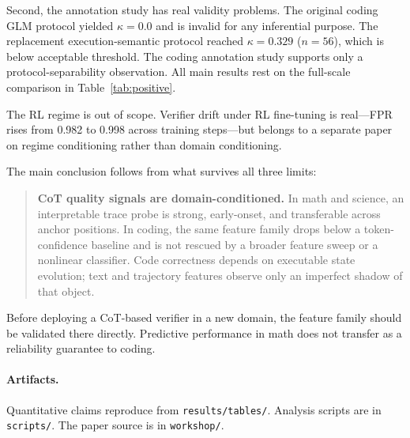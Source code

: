 \documentclass[10pt,twocolumn]{article}
\begin{document}
Second, the annotation study has real validity problems. The original coding GLM protocol yielded $\kappa = 0.0$ and is invalid for any inferential purpose. The replacement execution-semantic protocol reached $\kappa = 0.329$ ($n = 56$), which is below acceptable threshold. The coding annotation study supports only a protocol-separability observation. All main results rest on the full-scale comparison in Table~\ref{tab:positive}.

The RL regime is out of scope. Verifier drift under RL fine-tuning is real---FPR rises from 0.982 to 0.998 across training steps---but belongs to a separate paper on regime conditioning rather than domain conditioning.

The main conclusion follows from what survives all three limits:

\begin{quote}
\textbf{CoT quality signals are domain-conditioned.} In math and science, an interpretable trace probe is strong, early-onset, and transferable across anchor positions. In coding, the same feature family drops below a token-confidence baseline and is not rescued by a broader feature sweep or a nonlinear classifier. Code correctness depends on executable state evolution; text and trajectory features observe only an imperfect shadow of that object.
\end{quote}

Before deploying a CoT-based verifier in a new domain, the feature family should be validated there directly. Predictive performance in math does not transfer as a reliability guarantee to coding.

\paragraph{Artifacts.} Quantitative claims reproduce from \texttt{results/tables/}. Analysis scripts are in \texttt{scripts/}. The paper source is in \texttt{workshop/}.
\end{document}
